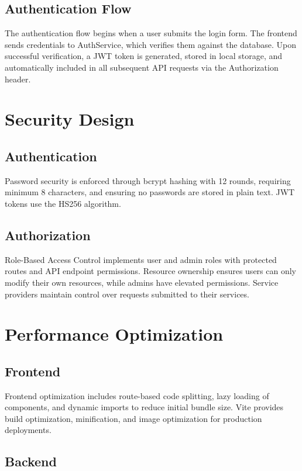 \documentclass[12pt,a4paper]{report}
\begin{document}
\subsection{Authentication Flow}

The authentication flow begins when a user submits the login form. The frontend sends credentials to AuthService, which verifies them against the database. Upon successful verification, a JWT token is generated, stored in local storage, and automatically included in all subsequent API requests via the Authorization header.

\section{Security Design}

\subsection{Authentication}

Password security is enforced through bcrypt hashing with 12 rounds, requiring minimum 8 characters, and ensuring no passwords are stored in plain text. JWT tokens use the HS256 algorithm.

\subsection{Authorization}

Role-Based Access Control implements user and admin roles with protected routes and API endpoint permissions. Resource ownership ensures users can only modify their own resources, while admins have elevated permissions. Service providers maintain control over requests submitted to their services.

\section{Performance Optimization}

\subsection{Frontend}

Frontend optimization includes route-based code splitting, lazy loading of components, and dynamic imports to reduce initial bundle size. Vite provides build optimization, minification, and image optimization for production deployments.

\subsection{Backend}
\end{document}
